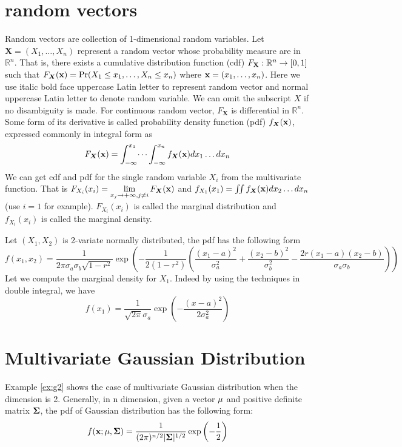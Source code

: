 \section{random vectors}
Random vectors are collection of 1-dimensional random variables. Let $\bm{X} = (X_1, \dots, X_n)$ 
represent a random vector whose probability measure are in $\mathbb{R}^n$.
That is, there exists a cumulative distribution function (cdf) $F_{\mathbf{X}}: \mathbb{R}^n \rightarrow [0,1]$ 
such that $F_{\bm{X}}(\mathbf{x}) = \Pr(X_1 \leq x_1, \dots, X_n \leq x_n)$ where $ \mathbf{x} = (x_1, \dots, x_n)$.
Here we use italic bold face uppercase Latin letter to represent random vector and normal uppercase Latin letter to denote random variable. We can omit the subscript $X$ if no disambiguity is made. For continuous random vector, $F_{\bm{X}}$ is differential in $\mathbb{R}^n$. Some form of its derivative is called probability density function (pdf) $f_{\bm{X}}(\mathbf{x})$, expressed commonly in integral form as
\begin{equation}
F_{\bm{X}}(\mathbf{x}) = \int_{-\infty}^{x_1}\dots\int_{-\infty}^{x_n} f_{\bm{X}}(\mathbf{x}) dx_1 \dots dx_n
\end{equation}
We can get cdf and pdf for the single random variable $X_i$ from the multivariate function. That is
$ F_{X_i}(x_i) = \displaystyle\lim_{x_j \to +\infty, j\neq i} F_{\bm{X}}(\mathbf{x})$ and 
$ f_{X_1}(x_1) = \iint f_{\bm{X}}(\mathbf{x})dx_2 \dots d x_n$ (use $i=1$ for example).
$F_{X_i}(x_i)$ is called the marginal distribution and $f_{X_i}(x_i)$ is called the marginal density.

\begin{example}\label{ex:g2}
	Let $(X_1, X_2)$ is 2-variate normally distributed,  the pdf has the following form
\begin{equation}
f(x_1, x_2) = \frac{1}{2\pi \sigma_a \sigma_b \sqrt{1-r^2}} \exp(-\frac{1}{2(1-r^2)} \left(\frac{(x_1-a)^2}{\sigma_a^2} + \frac{(x_2-b)^2}{\sigma_b^2} -\frac{2r(x_1-a)(x_2-b)}{\sigma_a \sigma_b}\right)) 
\end{equation}
Let we compute the marginal density for $X_1$. Indeed by using the techniques in double integral, we have
\begin{equation}
f(x_1) = \frac{1}{\sqrt{2\pi}\sigma_a} \exp(-\frac{(x-a)^2}{2\sigma_a^2})
\end{equation}

\end{example}

\section{Multivariate Gaussian Distribution}
Example \ref{ex:g2} shows the case of multivariate Gaussian distribution when the dimension is 2. Generally, in n dimension, given a vector $\mathbf{\mu}$ and positive definite matrix $\mathbf{\Sigma}$, the pdf of Gaussian distribution has the following form:
\begin{equation}
f(\mathbf{x}; \mathbf{\mu}, \mathbf{\Sigma}) = \frac{1}{(2\pi)^{n/2} \lvert\mathbf{\Sigma}\rvert^{1/2}} \exp \left(-\frac{1}{2} \right)
\end{equation}